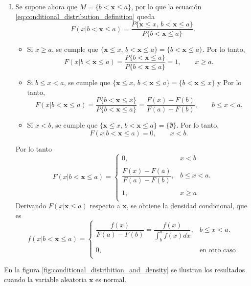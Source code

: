 \documentclass[a4paper]{report}
\newcommand{\x}{\mathbf{x}}
\begin{document}
\begin{enumerate}[I.]
\begin{equation}
\begin{array}{ll}
  0, & x\geq a \\
 \end{array} \right.
 \end{equation}
 \item Se supone ahora que \(M=\{b<\x\leq a\}\), por lo que la ecuación \ref{eq:conditional_distribution_definition} queda
 \[
  F(x|b<\x\leq a)=\frac{P\{\x\leq x,\,b<\x\leq a\}}{P\{b<\x\leq a\}}.
 \]
 \begin{itemize}
  \item Si \(x\geq a\), se cumple que \(\{\x\leq x,\,b<\x\leq a\}=\{b<\x\leq a\}\). Por lo tanto,
 \[
  F(x|b<\x\leq a)=\frac{P\{b<\x\leq a\}}{P\{b<\x\leq a\}}=1,\qquad x\geq a.
 \]
 \item Si \(b\leq x<a\), se cumple que \(\{\x\leq x,\,b<\x\leq a\}=\{b<\x\leq x\}\) y Por lo tanto,
 \[
  F(x|b<\x\leq a)=\frac{P\{b<\x\leq x\}}{P\{b<\x\leq a\}}=\frac{F(x)-F(b)}{F(a)-F(b)},\qquad b\leq x<a.
 \]
 \item Si \(x<b\), se cumple que \(\{\x\leq x,\,b<\x\leq a\}=\{\emptyset\}\). Por lo tanto,
 \[
  F(x|b<\x\leq a)=0,\qquad x<b.
 \]
 \end{itemize}
 Por lo tanto
 \begin{equation}\label{eq:rv_conditional_distribution_b_leq_x_leq_a}
  F(x|b<\x\leq a)=
 \left\{\begin{array}{ll}
  0, & x<b \\
  \\
 \dfrac{F(x)-F(a)}{F(a)-F(b)}, & b\leq x<a.\\
  \\
  1, & x\geq a \\
 \end{array} \right.
 \end{equation}
 Derivando \(F(x|\x\leq a)\) respecto a \(\x\), se obtiene la densidad condicional, que es
 \begin{equation}\label{eq:rv_conditional_density_b_leq_x_leq_a}
  f(x|b<\x\leq a)=
 \left\{\begin{array}{ll}
 \dfrac{f(x)}{F(a)-F(b)}=\dfrac{f(x)}{\int_{b}^{a}f(x)dx}, & b\leq x<a.\\
  \\
  0, & \textrm{en otro caso} \\
 \end{array} \right.
 \end{equation}
\end{enumerate}
En la figura \ref{fig:conditional_distribition_and_density} se ilustran los resultados cuando la variable aleatoria \(\x\) es normal.
\end{document}
